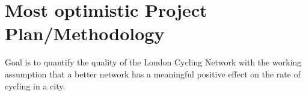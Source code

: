 \documentclass[11pt]{article} %
\begin{document}
%
%
%
%
%
%
%
%
%
%
%
%


\section{Most optimistic Project Plan/Methodology}

Goal is to quantify the quality of the London Cycling Network with the working assumption that a better network has a meaningful positive effect on the rate of cycling in a city. 
\end{document}
